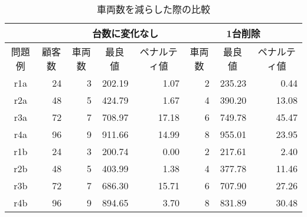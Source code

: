\begin{table}[]
\renewcommand{\arraystretch}{0.8}
\caption{車両数を減らした際の比較}
\label{m-1}
\begin{tabular}{cl|lll|lll}
\hline
                            & \multicolumn{1}{c|}{}    & \multicolumn{3}{c|}{台数に変化なし}                                               & \multicolumn{3}{c}{1台削除}                                                \\ \hline
問題例                          & \multicolumn{1}{c|}{顧客数} & \multicolumn{1}{c}{車両数} & \multicolumn{1}{c}{最良値} & \multicolumn{1}{c|}{ペナルティ値} & \multicolumn{1}{c}{車両数} & \multicolumn{1}{c}{最良値} & \multicolumn{1}{c}{ペナルティ値} \\ \hline
r1a                         & \multicolumn{1}{r|}{24}  & \multicolumn{1}{r}{3} & \multicolumn{1}{r}{202.19} & \multicolumn{1}{r|}{1.07}  & \multicolumn{1}{r}{2} & \multicolumn{1}{r}{235.23} & \multicolumn{1}{r}{0.44}  \\
r2a                         & \multicolumn{1}{r|}{48}  & \multicolumn{1}{r}{5} & \multicolumn{1}{r}{424.79} & \multicolumn{1}{r|}{1.67}  & \multicolumn{1}{r}{4} & \multicolumn{1}{r}{390.20} & \multicolumn{1}{r}{13.08}  \\
r3a                         & \multicolumn{1}{r|}{72}  & \multicolumn{1}{r}{7} & \multicolumn{1}{r}{708.97} & \multicolumn{1}{r|}{17.18}  & \multicolumn{1}{r}{6} & \multicolumn{1}{r}{749.78} & \multicolumn{1}{r}{45.47}  \\
r4a                         & \multicolumn{1}{r|}{96}  & \multicolumn{1}{r}{9} & \multicolumn{1}{r}{911.66} & \multicolumn{1}{r|}{14.99}  & \multicolumn{1}{r}{8} & \multicolumn{1}{r}{955.01} & \multicolumn{1}{r}{23.95}  \\
r1b                       & \multicolumn{1}{r|}{24}  & \multicolumn{1}{r}{3} & \multicolumn{1}{r}{200.74} & \multicolumn{1}{r|}{0.00}  & \multicolumn{1}{r}{2} & \multicolumn{1}{r}{217.61} & \multicolumn{1}{r}{2.40}  \\
r2b                        & \multicolumn{1}{r|}{48}  & \multicolumn{1}{r}{5} & \multicolumn{1}{r}{403.99} & \multicolumn{1}{r|}{1.38}  & \multicolumn{1}{r}{4} & \multicolumn{1}{r}{377.78} & \multicolumn{1}{r}{11.46}  \\
r3b                           & \multicolumn{1}{r|}{72}  & \multicolumn{1}{r}{7} & \multicolumn{1}{r}{686.30} & \multicolumn{1}{r|}{15.71}  & \multicolumn{1}{r}{6} & \multicolumn{1}{r}{707.90} & \multicolumn{1}{r}{27.26}  \\
r4b                         & \multicolumn{1}{r|}{96}  & \multicolumn{1}{r}{9} & \multicolumn{1}{r}{894.65} & \multicolumn{1}{r|}{3.70}  & \multicolumn{1}{r}{8} & \multicolumn{1}{r}{831.89} & \multicolumn{1}{r}{30.48}  \\ \hline
\end{tabular}
\end{table}


